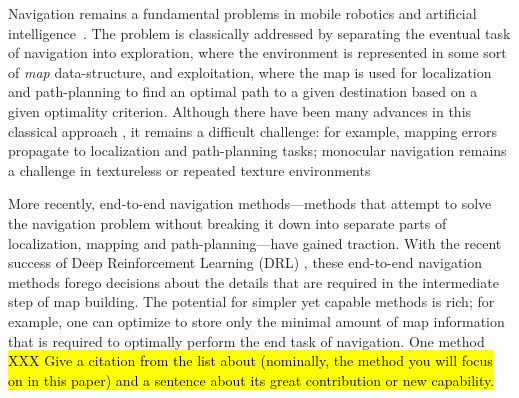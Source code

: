 
Navigation remains a fundamental problems in mobile robotics and artificial intelligence~\cite{SmChIJRR1986,ElCOMPUTER1980}.
The problem is classically addressed by separating the eventual task of navigation into exploration, where the environment is represented in some sort of \emph{map} data-structure, and exploitation, where the map is used for localization and path-planning to find an optimal path to a given destination based on a given optimality criterion.  Although there have been many advances in this classical approach \cite{XXX}, it remains a difficult challenge: for example, mapping errors propagate to localization and path-planning tasks; monocular navigation remains a challenge in textureless or repeated texture environments 

More recently, end-to-end navigation methods---methods that attempt to  
solve the navigation problem without breaking it down into separate parts of localization, mapping and path-planning---have gained traction.
%
With the recent success of Deep Reinforcement Learning (DRL) \cite{MnKaSiNATURE2015,MnKaSiNATURE2015}, these end-to-end navigation methods \cite{MnBaMiICML2016,SiHuMaNATURE2016,LePaKrISER2017,MiPaViICLR2017,OhChSiICML2016} forego decisions about the details that are required in the intermediate step of map building.  The potential for simpler yet capable methods is rich; for example, one can optimize to store only the minimal amount of map information that is required to optimally perform the end task of navigation.  One method \hl{XXX Give a citation from the list about (nominally, the method you will focus on in this paper) and a sentence about its great contribution or new capability.}


